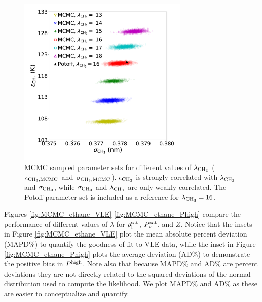 \documentclass[preprint,letterpaper,floatfix,citeautoscript,aip,jcp]{revtex4-1}
\begin{document}
\begin{figure}[htb!]
	\centering
	\includegraphics[width=3.2in]{MCMC_ethane_parameter_space}
	\caption{MCMC sampled parameter sets for different values of $\lambda_{\rm CH_3}$ ($\epsilon_{\rm CH_3, MCMC}$ and $\sigma_{\rm CH_3, MCMC}$). $\epsilon_{\rm CH_3}$ is strongly correlated with $\lambda_{\rm CH_3}$ and $\sigma_{\rm CH_3}$, while $\sigma_{\rm CH_3}$ and $\lambda_{\rm CH_3}$ are only weakly correlated. The Potoff parameter set is included as a reference for $\lambda_{\rm CH_3} = 16$. \cite{Mie} } 
	\label{fig:MCMC_ethane_parameter_space}
\end{figure}
Figures \ref{fig:MCMC_ethane_VLE}-\ref{fig:MCMC_ethane_Phigh} compare the performance of different values of $\lambda$ for $\rho_{\rm l}^{\rm sat}$, $P_{\rm v}^{\rm sat}$, and $Z$. Notice that the insets in Figure \ref{fig:MCMC_ethane_VLE} plot the mean absolute percent deviation (MAPD\%) to quantify the goodness of fit to VLE data, while the inset in Figure \ref{fig:MCMC_ethane_Phigh} plots the average deviation (AD\%) to demonstrate the positive bias in $P^{\rm high}$. Note also that because MAPD\% and AD\% are percent deviations they are not directly related to the squared deviations of the normal distribution used to compute the likelihood. We plot MAPD\% and AD\% as these are easier to conceptualize and quantify. 
\end{document}
